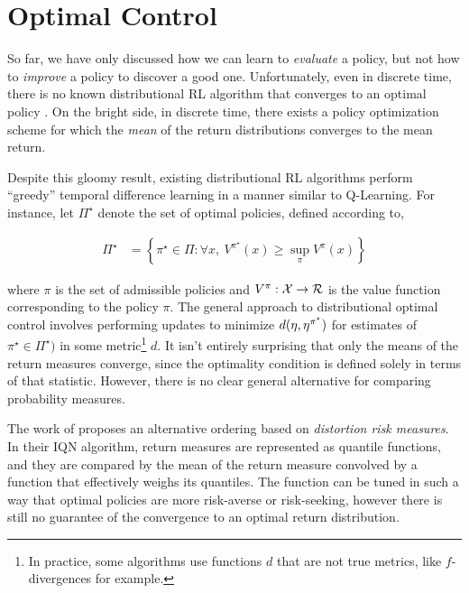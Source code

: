 \section{Optimal Control}\label{s:control}
So far, we have only discussed how we can learn to \emph{evaluate} a
policy, but not how to \emph{improve} a policy to discover a good
one. Unfortunately, even in discrete time, there is no known
distributional RL algorithm that converges to an optimal policy
\citep{Bellemare2017ADP}. On the bright side, in discrete time, there
exists a policy optimization scheme for which the \emph{mean} of the
return distributions converges to the mean return.

Despite this gloomy result, existing distributional RL algorithms
perform ``greedy'' temporal difference learning in a manner similar to
Q-Learning. For instance, let $\Pi^\star$ denote the set of optimal
policies, defined according to,

\begin{align*}
  \Pi^\star &= \left\{\pi^\star\in\Pi : \forall x,\ V^{\pi^\star}(x)\geq\sup_\pi V^\pi(x)\right\}
\end{align*}

where $\pi$ is the set of admissible policies and
$V^\pi:\mathcal{X}\to\operatorname{\mathcal{R}}$ is the value function corresponding
to the policy $\pi$. The general approach to distributional optimal
control involves performing updates to minimize $d(\operatorname{\eta},
\operatorname{\eta}^{\pi^\star})$ for estimates of
$\pi^\star\in\Pi^\star)$ in some metric\footnote{In practice, some
  algorithms use functions $d$ that are not true metrics, like
  $f$-divergences for example.} $d$. It isn't entirely surprising that only the
means of the return measures converge, since the optimality condition
is defined solely in terms of that statistic. However, there is no
clear general alternative for comparing probability measures.

The work of \citet{dabney2018implicit} proposes an alternative
ordering based on \emph{distortion risk measures}. In their IQN
algorithm, return measures are represented as quantile functions, and
they are compared by the mean of the return measure convolved by a
function that effectively weighs its quantiles. The function can be
tuned in such a way that optimal policies are more risk-averse or
risk-seeking, however there is still no guarantee of the convergence to
an optimal return distribution.

